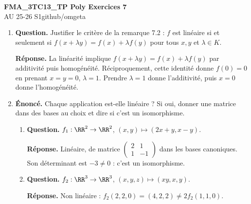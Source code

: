\documentclass[12pt, a4paper]{article}
\newcommand{\mytitle}{FMA\_3TC13\_TP Poly Exercices 7}
\newcommand{\myauthor}{github/omgeta}
\newcommand{\mydate}{AU 25-26 S1}
\begin{document}
\raggedright
\footnotesize
\begin{center}
{\normalsize{\textbf{\mytitle}}} \\
{\footnotesize{\mydate\hspace{2pt}\textemdash\hspace{2pt}\myauthor}}
\end{center}
\begin{enumerate}[label=7.\arabic*., start=68]

  \item \begin{minipage}[t]{\linewidth}\raggedright
\textbf{Question.} Justifier le critère de la remarque 7.2 : $f$ est linéaire si et seulement si $f(x+\lambda y)=f(x)+\lambda f(y)$ pour tous $x,y$ et $\lambda\in K$.
\par\smallskip
\textbf{Réponse.} La linéarité implique $f(x+\lambda y)=f(x)+\lambda f(y)$ par additivité puis homogénéité.
    Réciproquement, cette identité donne $f(0)=0$ en prenant $x=y=0$, $\lambda=1$.
    Prendre $\lambda=1$ donne l'additivité, puis $x=0$ donne l'homogénéité.
\end{minipage}

  \item \begin{minipage}[t]{\linewidth}\raggedright
\textbf{Énoncé.} Chaque application est-elle linéaire ? Si oui, donner une matrice dans des bases au choix et dire si c’est un isomorphisme.

\begin{enumerate}[\arabic*.]
        \item \textbf{Question.} $f_1:\RR^2\to\RR^2$, $(x,y)\mapsto(2x+y,x-y)$.
\par\smallskip
\textbf{Réponse.} Linéaire, de matrice $\begin{pmatrix}2&1\\1&-1\end{pmatrix}$ dans les bases canoniques.
        Son déterminant est $-3\neq0$ : c'est un isomorphisme.

  \item \textbf{Question.} $f_2:\RR^3\to\RR^3$, $(x,y,z)\mapsto(xy,x,y)$.
\par\smallskip
\textbf{Réponse.} Non linéaire : $f_2(2,2,0)=(4,2,2)\neq2f_2(1,1,0)$.


\end{enumerate}
\end{minipage}
\end{enumerate}
\end{document}
